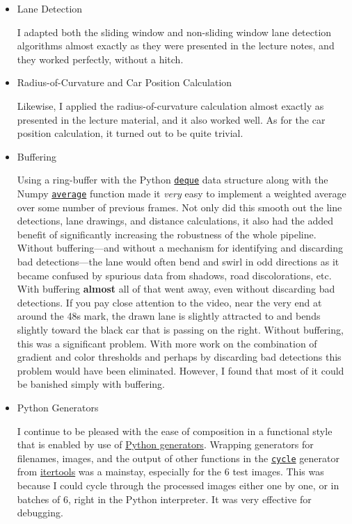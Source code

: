 \documentclass[11pt]{article}
\begin{document}
\begin{itemize}
\item Lane Detection
\label{sec-1-3-1-4}

I adapted both the sliding window and non-sliding window lane
detection algorithms almost exactly as they were presented in
the lecture notes, and they worked perfectly, without a
hitch.  

\item Radius-of-Curvature and Car Position Calculation
\label{sec-1-3-1-5}

Likewise, I applied the radius-of-curvature calculation almost
exactly as presented in the lecture material, and it also
worked well.  As for the car position calculation, it turned
out to be quite trivial. 

\item Buffering
\label{sec-1-3-1-6}

Using a ring-buffer with the Python \href{https://docs.python.org/2/library/collections.html#collections.deque}{\texttt{deque}} data structure
along with the Numpy \href{https://docs.scipy.org/doc/numpy/reference/generated/numpy.average.html#numpy-average}{\texttt{average}} function made it \emph{very} easy to
implement a weighted average over some number of previous
frames.  Not only did this smooth out the line detections,
lane drawings, and distance calculations, it also had the
added benefit of significantly increasing the robustness of
the whole pipeline.  Without buffering---and without a
mechanism for identifying and discarding bad detections---the
lane would often bend and swirl in odd directions as it became
confused by spurious data from shadows, road discolorations,
etc.  With buffering \textbf{almost} all of that went away, even
without discarding bad detections.  If you pay close attention
to the video, near the very end at around the 48s mark, the
drawn lane is slightly attracted to and bends slightly toward
the black car that is passing on the right.  Without
buffering, this was a significant problem.  With more work on
the combination of gradient and color thresholds and perhaps
by discarding bad detections this problem would have been
eliminated.  However, I found that most of it could be
banished simply with buffering.  

\item Python Generators
\label{sec-1-3-1-7}

I continue to be pleased with the ease of composition in a
functional style that is enabled by use of \href{http://davidaventimiglia.com/python_generators.html}{Python generators}.
Wrapping generators for filenames, images, and the output of
other functions in the \href{https://docs.python.org/3/library/itertools.html#itertools.cycle}{\texttt{cycle}} generator from \href{https://docs.python.org/3/library/itertools.html}{itertools} was a
mainstay, especially for the 6 test images.  This was because
I could cycle through the processed images either one by one,
or in batches of 6, right in the Python interpreter.  It was
very effective for debugging.
\end{itemize}
\end{document}
